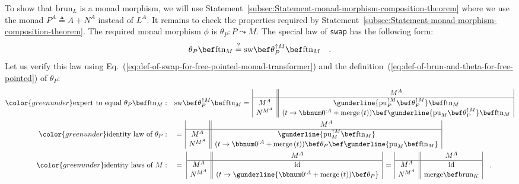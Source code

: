 To show that $\text{brun}_{L}$ is a monad morphism, we will use Statement~\ref{subsec:Statement-monad-morphism-composition-theorem}
where we use the monad $P^{A}\triangleq A+N^{A}$ instead of $L^{A}$.
It remains to check the properties required by Statement~\ref{subsec:Statement-monad-morphism-composition-theorem}.
The required monad morphism $\phi$ is $\theta_{P}:P\leadsto M$.
The special law of \lstinline!swap! has the following form: 
\[
\theta_{P}\bef\text{ftn}_{M}\overset{?}{=}\text{sw}\bef\theta_{P}^{\uparrow M}\bef\text{ftn}_{M}\quad.
\]
Let us verify this law using Eq.~(\ref{eq:def-of-swap-for-free-pointed-monad-transformer})
and the definition~(\ref{eq:def-of-brun-and-theta-for-free-pointed})
of $\theta_{P}$:
\begin{align*}
{\color{greenunder}\text{expect to equal }\theta_{P}\bef\text{ftn}_{M}:}\quad & \text{sw}\bef\theta_{P}^{\uparrow M}\bef\text{ftn}_{M}=\,\begin{array}{|c||c|}
 & M^{A}\\
\hline M^{A} & \gunderline{\text{pu}_{P}^{\uparrow M}\bef\theta_{P}^{\uparrow M}}\bef\text{ftn}_{M}\\
N^{M^{A}} & (t\rightarrow\bbnum 0^{:A}+\text{merge}\,(t))\bef\gunderline{\text{pu}_{M}\bef\theta_{P}^{\uparrow M}}\bef\text{ftn}_{M}
\end{array}\\
{\color{greenunder}\text{identity law of }\theta_{P}:}\quad & =\,\begin{array}{|c||c|}
 & M^{A}\\
\hline M^{A} & \gunderline{\text{pu}_{M}^{\uparrow M}\bef\text{ftn}_{M}}\\
N^{M^{A}} & (t\rightarrow\bbnum 0^{:A}+\text{merge}\,(t))\bef\theta_{P}\bef\gunderline{\text{pu}_{M}\bef\text{ftn}_{M}}
\end{array}\\
{\color{greenunder}\text{identity laws of }M:}\quad & =\,\,\begin{array}{|c||c|}
 & M^{A}\\
\hline M^{A} & \text{id}\\
N^{M^{A}} & (t\rightarrow\gunderline{\bbnum 0^{:A}+\text{merge}\,(t))\bef\theta_{P}}
\end{array}\,=\,\begin{array}{|c||c|}
 & M^{A}\\
\hline M^{A} & \text{id}\\
N^{M^{A}} & \text{merge}\bef\text{brun}_{K}
\end{array}\quad.
\end{align*}
